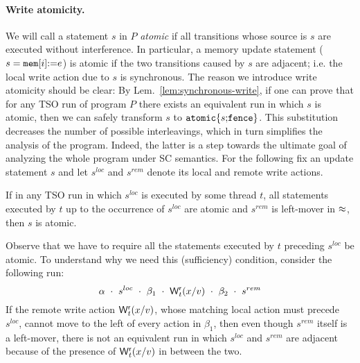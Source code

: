 \paragraph{Write atomicity.}
We will call a statement $s$ in $P$ {\em atomic} if all transitions whose source is $s$ are executed without interference. 
In particular, a memory update statement ($s=\mathtt{mem}[i]\mathtt{:=} e$) is atomic if the two transitions caused by $s$ are adjacent; i.e. the local write action due to $s$ is synchronous.
The reason we introduce write atomicity should be clear: By Lem.~\ref{lem:synchronous-write}, if one can prove that for any TSO run of program $P$ there exists an equivalent run in which $s$ is atomic, then we can safely transform $s$ to $\mathtt{atomic}\{s\mathtt{;} \mathtt{fence}\}$.
This substitution decreases the number of possible interleavings, which in turn simplifies the analysis of the program.
Indeed, the latter is a step towards the ultimate goal of analyzing the whole program under SC semantics.
For the following fix an update statement $s$ and let $s^{loc}$ and $s^{rem}$ denote its local and remote write actions.
\begin{lemma}
If in any TSO run in which $s^{loc}$ is executed by some thread $t$, all statements executed by $t$ up to the occurrence of $s^{loc}$ are atomic and $s^{rem}$ is left-mover in $\approx$, then $s$ is atomic.
\end{lemma}
Observe that we have to require all the statements executed by $t$ preceding $s^{loc}$ be atomic.
To understand why we need this (sufficiency) condition, consider the following run:
\[
\mathbf{\alpha}\ \cdot\ s^{loc}\ \cdot\ \mathbf{\beta}_1\ \cdot\ \remwritex t x v\ \cdot\ \mathbf{\beta}_2\ \cdot\ s^{rem}
\]
If the remote write action $\mathsf{W}^{\mathsf{r}}_{t}(x/v)$, whose matching local action must precede $s^{loc}$, cannot move to the left of every action in $\beta_1$, then even though $s^{rem}$ itself is a left-mover, there is not an equivalent run in which $s^{loc}$ and $s^{rem}$ are adjacent because of the presence of $\mathsf{W}^{\mathsf{r}}_{t}(x/v)$ in between the two.

